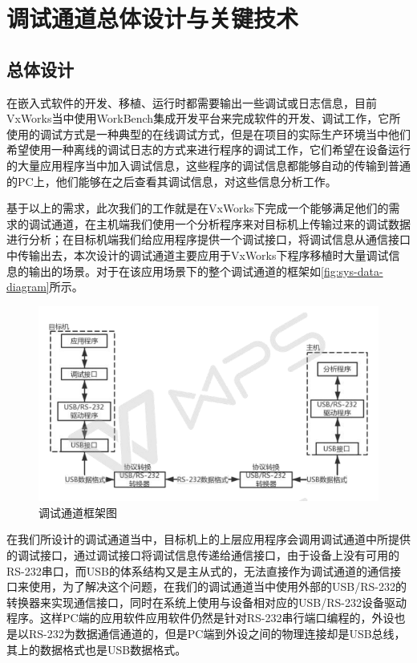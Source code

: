 \chapter{调试通道总体设计与关键技术}

\section{总体设计}
	在嵌入式软件的开发、移植、运行时都需要输出一些调试或日志信息，目前VxWorks当中使用WorkBench集成开发平台来完成软件的开发、调试工作，它所使用的调试方式是一种典型的在线调试方式，但是在项目的实际生产环境当中他们希望使用一种离线的调试日志的方式来进行程序的调试工作，它们希望在设备运行的大量应用程序当中加入调试信息，这些程序的调试信息都能够自动的传输到普通的PC上，他们能够在之后查看其调试信息，对这些信息分析工作。
	
	基于以上的需求，此次我们的工作就是在VxWorks下完成一个能够满足他们的需求的调试通道，在主机端我们使用一个分析程序来对目标机上传输过来的调试数据进行分析；在目标机端我们给应用程序提供一个调试接口，将调试信息从通信接口中传输出去，本次设计的调试通道主要应用于VxWorks下程序移植时大量调试信息的输出的场景。对于在该应用场景下的整个调试通道的框架如\autoref{fig:sys-data-diagram}所示。

\begin{figure}[!h]
\centering
\includegraphics[width=1.0\textwidth]{./graphics/sys-data-diagram.pdf}
\caption{调试通道框架图}\label{fig:sys-data-diagram}
\end{figure}

	在我们所设计的调试通道当中，目标机上的上层应用程序会调用调试通道中所提供的调试接口，通过调试接口将调试信息传递给通信接口，由于设备上没有可用的RS-232串口，而USB的体系结构又是主从式的，无法直接作为调试通道的通信接口来使用，为了解决这个问题，在我们的调试通道当中使用外部的USB/RS-232的转换器来实现通信接口，同时在系统上使用与设备相对应的USB/RS-232设备驱动程序。这样PC端的应用软件应用软件仍然是针对RS-232串行端口编程的，外设也是以RS-232为数据通信通道的，但是PC端到外设之间的物理连接却是USB总线，其上的数据格式也是USB数据格式。
	
